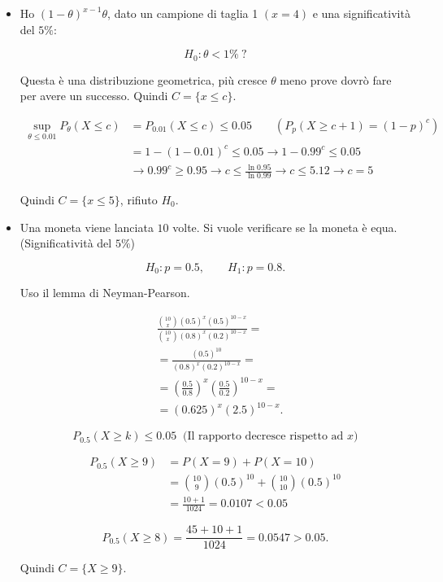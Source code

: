 \documentclass{article}
\begin{document}
\begin{itemize}
\[
H_0:\sigma^2=16,
\qquad
H_1:\sigma^2\neq16.
\]

\begin{align*}
\chi^2&=
\frac{(n-1)S^2}{\sigma_0^2}=
\frac{19\cdot25}{16}
=
29.69
\\
\\
C&=
\{\chi^2<\chi^2_{19,0.025}\}
\cup
\{\chi^2>\chi^2_{19,0.975}\}=\{\chi^2<8.907\}\cup\{\chi^2>32.852\}\rightarrow\text{ Non rifiuto }H_0
\end{align*}

\item Ho $(1-\theta)^{x-1}\theta$, dato un campione di taglia 1 $(x=4)$ e una significatività del $5\%$:

$$H_0:\theta<1\%\ ?$$

Questa è una distribuzione geometrica, più cresce $\theta$ meno prove dovrò fare per avere un successo. Quindi $C=\{x\leq c\}$.

\begin{align*}
    \sup_{\theta\leq0.01}P_\theta(X\leq c)&=P_{0.01}(X\leq c)\leq0.05\qquad(P_p(X\geq c+1)=(1-p)^c)\\
    &=1-(1-0.01)^c\leq0.05\rightarrow1-0.99^c\leq0.05\\
    &\rightarrow0.99^c\geq0.95\rightarrow c\leq\frac{\ln0.95}{\ln0.99}\rightarrow c\leq5.12\rightarrow c=5
\end{align*}

Quindi $C=\{x\leq5\}$, rifiuto $H_0$.

\item Una moneta viene lanciata $10$ volte. Si vuole verificare se la moneta è equa. (Significatività del $5\%$)

\[
H_0:p=0.5,
\qquad
H_1:p=0.8.
\]

Uso il lemma di Neyman-Pearson.

\begin{align*}
&
\frac{\binom{10}{x}(0.5)^x(0.5)^{10-x}}
{\binom{10}{x}(0.8)^x(0.2)^{10-x}}=
\\
&=
\frac{(0.5)^{10}}
{(0.8)^x(0.2)^{10-x}}=
\\
&=
\left(\frac{0.5}{0.8}\right)^x
\left(\frac{0.5}{0.2}\right)^{10-x}=
\\
&=
(0.625)^x(2.5)^{10-x}.
\end{align*}

\[
P_{0.5}(X\geq k)\leq0.05\ \text{ (Il rapporto decresce rispetto ad $x$)}
\]

\begin{align*}
P_{0.5}(X\geq9)
&=
P(X=9)+P(X=10)
\\
&=
\binom{10}{9}(0.5)^{10}
+
\binom{10}{10}(0.5)^{10}
\\
&=
\frac{10+1}{1024}=
0.0107<0.05
\end{align*}

\[
P_{0.5}(X\geq8)
=
\frac{45+10+1}{1024}
=
0.0547>0.05.
\]

Quindi $C=\{X\geq9\}$.

\end{itemize}
\end{document}
